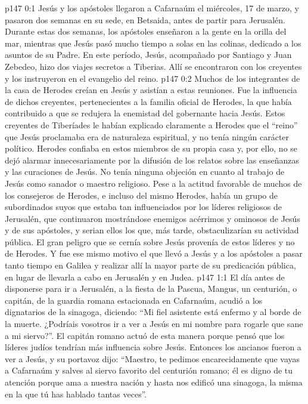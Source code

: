 \author{Comisión de seres intermedios}
\vs p147 0:1 Jesús y los apóstoles llegaron a Cafarnaúm el miércoles, 17 de marzo, y pasaron dos semanas en su sede, en Betsaida, antes de partir para Jerusalén. Durante estas dos semanas, los apóstoles enseñaron a la gente en la orilla del mar, mientras que Jesús pasó mucho tiempo a solas en las colinas, dedicado a los asuntos de su Padre. En este período, Jesús, acompañado por Santiago y Juan Zebedeo, hizo dos viajes secretos a Tiberias. Allí se encontraron con los creyentes y los instruyeron en el evangelio del reino.
\vs p147 0:2 Muchos de los integrantes de la casa de Herodes creían en Jesús y asistían a estas reuniones. Fue la influencia de dichos creyentes, pertenecientes a la familia oficial de Herodes, la que había contribuido a que se redujera la enemistad del gobernante hacia Jesús. Estos creyentes de Tiberíades le habían explicado claramente a Herodes que el “reino” que Jesús proclamaba era de naturaleza espiritual, y no tenía ningún carácter político. Herodes confiaba en estos miembros de su propia casa y, por ello, no se dejó alarmar innecesariamente por la difusión de los relatos sobre las enseñanzas y las curaciones de Jesús. No tenía ninguna objeción en cuanto al trabajo de Jesús como sanador o maestro religioso. Pese a la actitud favorable de muchos de los consejeros de Herodes, e incluso del mismo Herodes, había un grupo de subordinados suyos que estaba tan influenciados por los líderes religiosos de Jerusalén, que continuaron mostrándose enemigos acérrimos y ominosos de Jesús y de sus apóstoles, y serian ellos los que, más tarde, obstaculizarían su actividad pública. El gran peligro que se cernía sobre Jesús provenía de estos líderes y no de Herodes. Y fue ese mismo motivo el que llevó a Jesús y a los apóstoles a pasar tanto tiempo en Galilea y realizar allí la mayor parte de su predicación pública, en lugar de llevarla a cabo en Jerusalén y en Judea.
\vs p147 1:1 El día antes de disponerse para ir a Jerusalén, a la fiesta de la Pascua, Mangus, un centurión, o capitán, de la guardia romana estacionada en Cafarnaúm, acudió a los dignatarios de la sinagoga, diciendo: “Mi fiel asistente está enfermo y al borde de la muerte. ¿Podríais vosotros ir a ver a Jesús en mi nombre para rogarle que sane a mi siervo?”. El capitán romano actuó de esta manera porque pensó que los líderes judíos tendrían más influencia sobre Jesús. Entonces los ancianos fueron a ver a Jesús, y su portavoz dijo: “Maestro, te pedimos encarecidamente que vayas a Cafarnaúm y salves al siervo favorito del centurión romano; él es digno de tu atención porque ama a nuestra nación y hasta nos edificó una sinagoga, la misma en la que tú has hablado tantas veces”.
